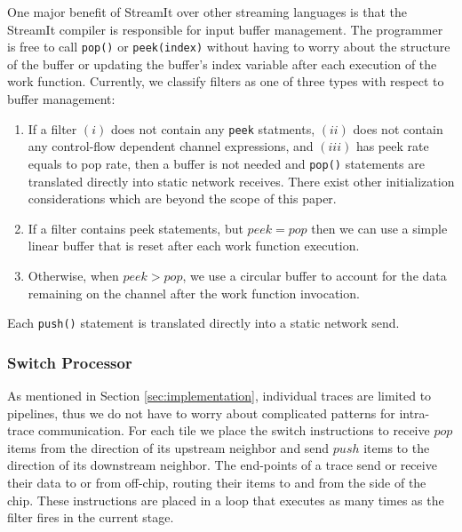 One major benefit of StreamIt over other streaming languages is that
the StreamIt compiler is responsible for input buffer management.  The
programmer is free to call {\tt pop()} or {\tt peek(index)} without
having to worry about the structure of the buffer or updating the
buffer's index variable after each execution of the work function.
Currently, we classify filters as one of three types with respect to
buffer management: 
\begin{enumerate}
\item If a filter $(i)$ does not contain any {\tt peek} statments, $(ii)$
does not contain any control-flow dependent channel expressions, and
$(iii)$ has peek rate equals to pop rate, then a buffer is not needed
and {\tt pop()} statements are translated directly into static network
receives.  There exist other initialization considerations which are
beyond the scope of this paper.
\item If a filter contains peek statements, but $peek = pop$ then we can
use a simple linear buffer that is reset after each work function execution.
\item Otherwise, when $peek > pop$, we use a circular buffer to
account for the data remaining on the channel after the work function
invocation.
\end{enumerate}
Each {\tt push()} statement is translated directly into a static
network send.  

\subsubsection{Switch Processor}
As mentioned in Section \ref{sec:implementation}, individual traces
are limited to pipelines, thus we do not have to worry about
complicated patterns for intra-trace communication.  For each tile we
place the switch instructions to receive $pop$ items from the
direction of its upstream neighbor and send $push$ items to the
direction of its downstream neighbor.  The end-points of a trace send
or receive their data to or from off-chip, routing their items to and
from the side of the chip. These instructions are placed in a loop
that executes as many times as the filter fires in the current stage.

